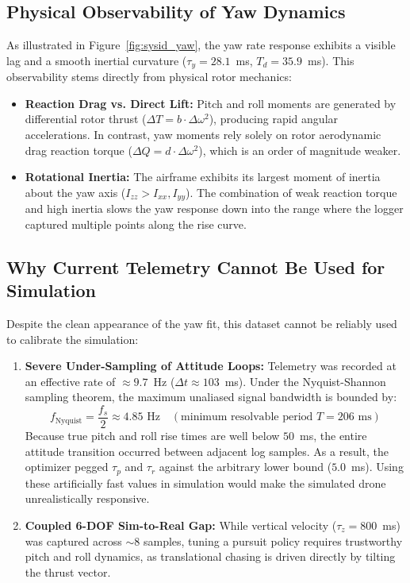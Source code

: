 \documentclass[11pt,a4paper]{article}
\begin{document}
\subsection{Physical Observability of Yaw Dynamics}
As illustrated in Figure~\ref{fig:sysid_yaw}, the yaw rate response exhibits a visible lag and a smooth inertial curvature ($\tau_y = 28.1$~ms, $T_d = 35.9$~ms). This observability stems directly from physical rotor mechanics:
\begin{itemize}[leftmargin=1.2em, itemsep=0.1em]
    \item \textbf{Reaction Drag vs. Direct Lift:} Pitch and roll moments are generated by differential rotor thrust ($\Delta T = b \cdot \Delta \omega^2$), producing rapid angular accelerations. In contrast, yaw moments rely solely on rotor aerodynamic drag reaction torque ($\Delta Q = d \cdot \Delta \omega^2$), which is an order of magnitude weaker.
    \item \textbf{Rotational Inertia:} The airframe exhibits its largest moment of inertia about the yaw axis ($I_{zz} > I_{xx}, I_{yy}$). The combination of weak reaction torque and high inertia slows the yaw response down into the range where the logger captured multiple points along the rise curve.
\end{itemize}

\subsection{Why Current Telemetry Cannot Be Used for Simulation}
Despite the clean appearance of the yaw fit, this dataset cannot be reliably used to calibrate the simulation:
\begin{enumerate}[leftmargin=1.2em, itemsep=0.2em]
    \item \textbf{Severe Under-Sampling of Attitude Loops:} Telemetry was recorded at an effective rate of $\approx 9.7$~Hz ($\Delta t \approx 103$~ms). Under the Nyquist-Shannon sampling theorem, the maximum unaliased signal bandwidth is bounded by:
    \begin{equation}
        f_{\text{Nyquist}} = \frac{f_s}{2} \approx 4.85\text{ Hz} \quad (\text{minimum resolvable period } T = 206\text{ ms})
    \end{equation}
    Because true pitch and roll rise times are well below $50$~ms, the entire attitude transition occurred between adjacent log samples. As a result, the optimizer pegged $\tau_p$ and $\tau_r$ against the arbitrary lower bound ($5.0$~ms). Using these artificially fast values in simulation would make the simulated drone unrealistically responsive.
    \item \textbf{Coupled 6-DOF Sim-to-Real Gap:} While vertical velocity ($\tau_z = 800$~ms) was captured across $\sim 8$ samples, tuning a pursuit policy requires trustworthy pitch and roll dynamics, as translational chasing is driven directly by tilting the thrust vector.
\end{enumerate}
\end{document}
